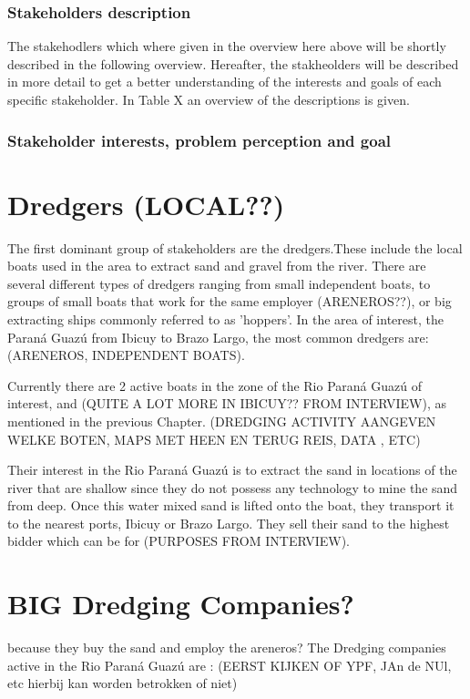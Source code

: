 \subsubsection{Stakeholders description}

The stakehodlers which where given in the overview here above will be shortly described in the following overview. Hereafter, the stakheolders will be described in more detail to get a better understanding of the interests and goals of each specific stakeholder. In Table X an overview of the descriptions is given.




\subsubsection{Stakeholder interests, problem perception and goal}



\section{Dredgers (LOCAL??)}
The first dominant group of stakeholders are the dredgers.These include the local boats used in the area to extract sand and gravel from the river. There are several different types of dredgers ranging from small independent boats, to groups of small boats that work for the same employer (ARENEROS??), or big extracting ships commonly referred to as 'hoppers'. In the area of interest, the Paraná Guazú from Ibicuy to Brazo Largo, the most common dredgers are: (ARENEROS, INDEPENDENT BOATS). 

Currently there are 2 active boats in the zone of the Rio Paraná Guazú of interest, and (QUITE A LOT MORE IN IBICUY?? FROM INTERVIEW), as mentioned in the previous Chapter. (DREDGING ACTIVITY AANGEVEN WELKE BOTEN, MAPS MET HEEN EN TERUG REIS, DATA , ETC)

Their interest in the Rio Paraná Guazú is to extract the sand in locations of the river that are shallow since they do not possess any technology to mine the sand from deep. Once this water mixed sand is lifted onto the boat, they transport it to the nearest ports, Ibicuy or Brazo Largo. They sell their sand to the highest bidder which can be for (PURPOSES FROM INTERVIEW).


\section{BIG Dredging Companies?}
because they buy the sand and employ the areneros?
The Dredging companies active in the Rio Paraná Guazú are :
(EERST KIJKEN OF YPF, JAn de NUl, etc hierbij kan worden betrokken of niet)


